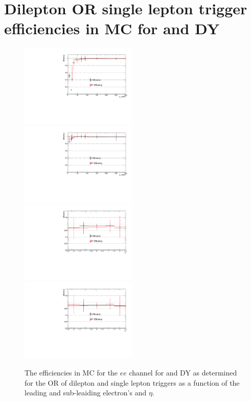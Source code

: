 \clearpage
\newpage

\section{Dilepton OR single lepton trigger efficiencies in MC for \ttbar and DY} \label{appSec:triggerSystPlots}

\begin{figure}[ht]
\centering
\includegraphics[width=0.495\textwidth]{figs/background-estimation/triggerEfficiency/DY/electron1_pT_eff.pdf}
\includegraphics[width=0.495\textwidth]{figs/background-estimation/triggerEfficiency/DY/electron2_pT_eff.pdf}
\\
\includegraphics[width=0.495\textwidth]{figs/background-estimation/triggerEfficiency/DY/electron1_eta_eff.pdf}
\includegraphics[width=0.495\textwidth]{figs/background-estimation/triggerEfficiency/DY/electron2_eta_eff.pdf}
\caption{
The efficiencies in MC for the $ee$ channel for \ttbar and DY as determined for the OR of dilepton and single lepton triggers as a function of the leading and sub-leaiding electron's \pT and $\eta$.
}
\label{fig:App_trigSyst_ee}
\end{figure}

